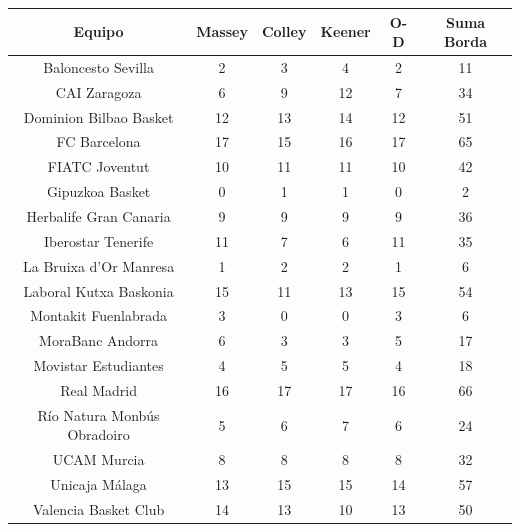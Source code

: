 \begin{center}
	\begin{tabular}{|c||c|c|c|c||c|}
	\hline \rule[-2ex]{0pt}{5.5ex} Equipo & Massey & Colley & Keener & O-D & Suma Borda \\ 
	\hline \rule[-2ex]{0pt}{5.5ex} Baloncesto Sevilla & 2 & 3 & 4 & 2 & 11 \\ 
	\hline \rule[-2ex]{0pt}{5.5ex} CAI Zaragoza & 6 & 9 & 12 & 7 & 34 \\ 
	\hline \rule[-2ex]{0pt}{5.5ex} Dominion Bilbao Basket & 12 & 13 & 14 & 12 & 51 \\ 
	\hline \rule[-2ex]{0pt}{5.5ex} FC Barcelona & 17 & 15 & 16 & 17 & 65 \\ 
	\hline \rule[-2ex]{0pt}{5.5ex} FIATC Joventut & 10 & 11 & 11 & 10 & 42 \\ 
	\hline \rule[-2ex]{0pt}{5.5ex} Gipuzkoa Basket & 0 & 1 & 1 & 0 & 2 \\ 
	\hline \rule[-2ex]{0pt}{5.5ex} Herbalife Gran Canaria & 9 & 9 & 9 & 9 & 36 \\ 
	\hline \rule[-2ex]{0pt}{5.5ex} Iberostar Tenerife & 11 & 7 & 6 & 11 & 35 \\ 
	\hline \rule[-2ex]{0pt}{5.5ex} La Bruixa d'Or Manresa & 1 & 2 & 2 & 1 & 6 \\ 
	\hline \rule[-2ex]{0pt}{5.5ex} Laboral Kutxa Baskonia & 15 & 11 & 13 & 15 & 54 \\ 
	\hline \rule[-2ex]{0pt}{5.5ex} Montakit Fuenlabrada & 3 & 0 & 0 & 3 & 6 \\ 
	\hline \rule[-2ex]{0pt}{5.5ex} MoraBanc Andorra & 6 & 3 & 3 & 5 & 17 \\ 
	\hline \rule[-2ex]{0pt}{5.5ex} Movistar Estudiantes & 4 & 5 & 5 & 4 & 18 \\ 
	\hline \rule[-2ex]{0pt}{5.5ex} Real Madrid & 16 & 17 & 17 & 16 & 66 \\ 
	\hline \rule[-2ex]{0pt}{5.5ex} Río Natura Monbús Obradoiro & 5 & 6 & 7 & 6 & 24 \\ 
	\hline \rule[-2ex]{0pt}{5.5ex} UCAM Murcia & 8 & 8 & 8 & 8 & 32 \\ 
	\hline \rule[-2ex]{0pt}{5.5ex} Unicaja Málaga & 13 & 15 & 15 & 14 & 57 \\ 
	\hline \rule[-2ex]{0pt}{5.5ex} Valencia Basket Club & 14 & 13 & 10 & 13 & 50 \\ 
	\hline 
\end{tabular}
\end{center} 

\newpage

